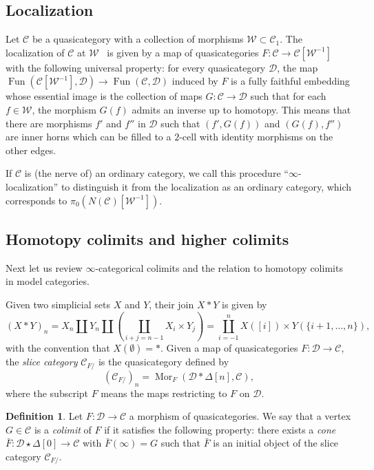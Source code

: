 \documentclass[a4paper,reqno]{amsart}
\theoremstyle{plain}
\theoremstyle{definition}
\newtheorem{definition}[theorem]{Definition}
\theoremstyle{remark}
\numberwithin{equation}{section}
\newcommand{\cC}{\mathcal{C}}
\newcommand{\cD}{\mathcal{D}}
\newcommand{\cW}{\mathcal{W}}
\DeclareMathOperator{\Fun}{Fun}
\DeclareMathOperator{\Mor}{Mor}
\begin{document}
\subsection{Localization}%

Let $\cC$ be a quasicategory with a collection of morphisms $\cW \subset \cC_1$.
The localization of $\cC$ at $\cW$~ is given by a map of quasicategories $F\colon \cC\to \cC[\cW^{-1}]$ with the following universal property: for every quasicategory $\cD$, the map $\Fun(\cC[\cW^{-1}],\cD) \to \Fun(\cC,\cD)$ induced by $F$ is a fully faithful embedding whose essential image is the collection of maps $G \colon \cC\to \cD$ such that for each $f \in \cW$, the morphism $G(f)$ admits an inverse up to homotopy.
This means that there are morphisms $f'$ and $f''$ in $\cD$ such that $(f', G(f))$ and $(G(f), f'')$ are inner horns which can be filled to a $2$-cell with identity morphisms on the other edges.

If $\cC$ is (the nerve of) an ordinary category, we call this procedure ``$\infty$-localization'' to distinguish it from the localization as an ordinary category, which corresponds to $\pi_0(N(\cC)[\cW^{-1}])$.

\subsection{Homotopy colimits and higher colimits}%

Next let us review $\infty$-categorical colimits and the relation to homotopy colimits in model categories.

Given two simplicial sets $X$ and $Y$, their join $X * Y$ is given by
\[
(X * Y)_n = X_n \amalg Y_n \amalg \left( \coprod_{i + j = n - 1} X_i \times Y_j \right) = \coprod_{i = -1}^n X([i]) \times Y(\{i + 1, \dots, n \}),
\]
with the convention that $X(\emptyset) = *$.
Given a map of quasicategories $F \colon \cD \to \cC$, the \emph{slice category} $\cC_{F/}$ is the quasicategory defined by
\[
(\cC_{F/})_n = \Mor_F(\cD * \Delta[n], \cC),
\]
where the subscript $F$ means the maps restricting to $F$ on $\cD$.

\begin{definition}
Let $F\colon \cD\to \cC$ a morphism of quasicategories.
We say that a vertex $G \in \cC$ is a \emph{colimit} of $F$ if it satisfies the following property: there exists a \emph{cone} $\bar{F} \colon \cD\star \Delta[0]\to \cC$ with $\bar{F}(\infty)=G$ such that  $\bar{F}$ is an initial object of the slice category $\cC_{F/}$.
\end{definition}
\end{document}
